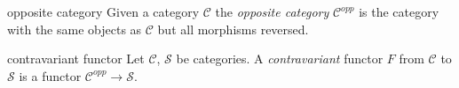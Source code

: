 \begin{frame}
\begin{block}{opposite category}
Given a category $\mathcal{C}$ the {\it opposite category}
$\mathcal{C}^{opp}$ is the category with the same objects
as $\mathcal{C}$ but all morphisms reversed.
\end{block}

\begin{block}{contravariant functor}
Let $\mathcal{C}$, $\mathcal{S}$ be categories.
A {\it contravariant} functor $F$
from $\mathcal{C}$ to $\mathcal{S}$
is a functor $\mathcal{C}^{opp}\to \mathcal{S}$.
\end{block}
\end{frame}